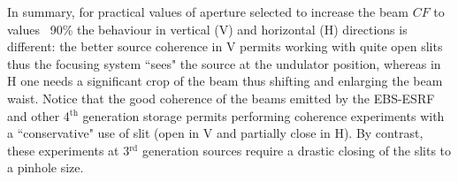 \documentclass[doublecol]{epl2}
\newcommand{\inred}[1]{{\color{black}#1}} %
\begin{document}
In summary, for practical values of aperture selected to increase the beam $CF$ to values ~90\% the behaviour in vertical (V) and horizontal (H) directions is different: the better source coherence in V permits working with quite open slits thus the focusing system \inred{``}sees" the source at the undulator position, whereas in H one needs a significant crop of the beam thus shifting and enlarging the beam waist. Notice that the good coherence of the beams emitted by the EBS-ESRF and other 4$^{\text{th}}$ generation storage permits performing coherence experiments with a \inred{``}conservative" use of slit (open in V and partially close in H). \inred{By contrast}, these experiments at 3$^{\text{rd}}$ generation sources require a drastic closing of the slits to a pinhole size.      

\end{document}
